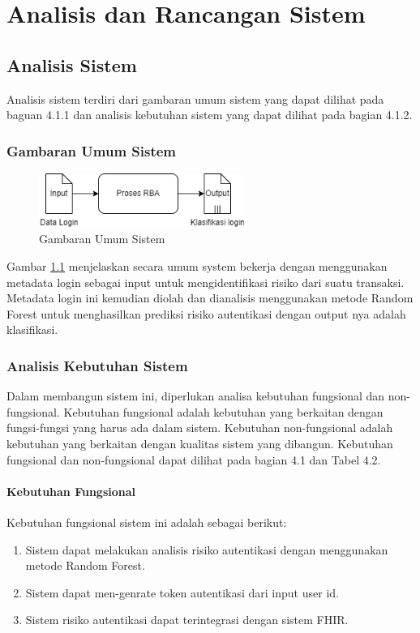 \chapter{Analisis dan Rancangan Sistem}

\section{Analisis Sistem}

Analisis sistem terdiri dari gambaran umum sistem yang dapat dilihat pada baguan 4.1.1 dan analisis kebutuhan sistem yang dapat dilihat pada bagian 4.1.2.

\subsection{Gambaran Umum Sistem}
\begin{figure}[H]
    \centering
    \includegraphics[width=0.6\textwidth]{contents/chapter-4/gambaran-umum.png}
    \caption{Gambaran Umum Sistem}
    \label{fig:gambaran-umum}
\end{figure}
Gambar \ref{fig:gambaran-umum} menjelaskan secara umum system bekerja dengan menggunakan metadata login sebagai input untuk mengidentifikasi risiko dari suatu transaksi. Metadata login ini kemudian diolah dan dianalisis menggunakan metode Random Forest untuk menghasilkan prediksi risiko autentikasi dengan output nya adalah klasifikasi.

\subsection{Analisis Kebutuhan Sistem}
Dalam membangun sistem ini, diperlukan analisa kebutuhan fungsional dan non-fungsional. Kebutuhan fungsional adalah kebutuhan yang berkaitan dengan fungsi-fungsi yang harus ada dalam sistem. Kebutuhan non-fungsional adalah kebutuhan yang berkaitan dengan kualitas sistem yang dibangun. Kebutuhan fungsional dan non-fungsional dapat dilihat pada bagian 4.1 dan Tabel 4.2.

\subsubsection{Kebutuhan Fungsional}
Kebutuhan fungsional sistem ini adalah sebagai berikut:
\begin{enumerate}
    \item Sistem dapat melakukan analisis risiko autentikasi dengan menggunakan metode Random Forest.
    \item Sistem dapat men-genrate token autentikasi dari input user id.
    \item Sistem risiko autentikasi dapat terintegrasi dengan sistem FHIR.
\end{enumerate}

